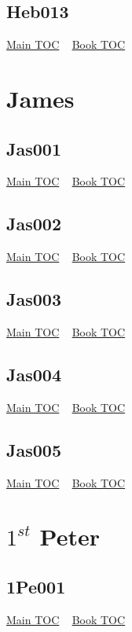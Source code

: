 \documentclass{book}
\begin{document}
  \section{Heb013}\hyperlink{toc}{Main TOC} ~ \hyperref[subsec:Heb]{Book TOC} 
  \chapter{James} \label{subsec:Jas} \begin{multicols}{2} \minitoc \end{multicols}
  \section{Jas001}\hyperlink{toc}{Main TOC} ~ \hyperref[subsec:Jas]{Book TOC} 
  \section{Jas002}\hyperlink{toc}{Main TOC} ~ \hyperref[subsec:Jas]{Book TOC} 
  \section{Jas003}\hyperlink{toc}{Main TOC} ~ \hyperref[subsec:Jas]{Book TOC} 
  \section{Jas004}\hyperlink{toc}{Main TOC} ~ \hyperref[subsec:Jas]{Book TOC} 
  \section{Jas005}\hyperlink{toc}{Main TOC} ~ \hyperref[subsec:Jas]{Book TOC} 
  \chapter{$1^{st}$ Peter} \label{subsec:1Pe} \begin{multicols}{2} \minitoc \end{multicols}
  \section{1Pe001}\hyperlink{toc}{Main TOC} ~ \hyperref[subsec:1Pe]{Book TOC} 
\end{document}
